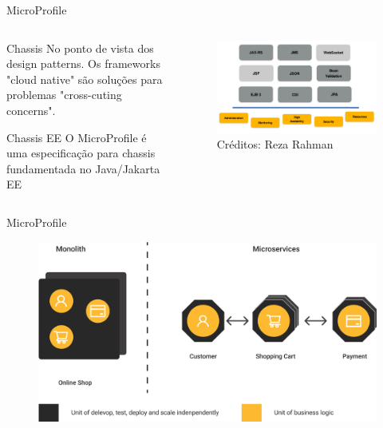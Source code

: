 \documentclass[aspectratio=169]{beamer}
\begin{document}
\begin{frame}{MicroProfile}



\begin{columns}[T] %
\begin{column}[T]{6cm} %
	\begin{block}{Chassis}
No ponto de vista dos design patterns. Os frameworks "cloud native" são soluções para problemas "cross-cuting concerns".
	\end{block}
    \begin{block}{Chassis EE}
O MicroProfile é uma especificação para chassis fundamentada no Java/Jakarta EE
	\end{block}
\end{column}
\begin{column}[T]{7cm} %
    \begin{figure}
    	\centering
    	\includegraphics[width=\linewidth]{Images/javaeemicropancake}
    	\caption{Créditos: Reza Rahman}
    \end{figure}

\end{column}
\end{columns}

\end{frame}

\begin{frame}{MicroProfile}
\begin{figure}
	\centering
	\includegraphics[width=0.7\linewidth]{Images/mp0}
\end{figure}
\end{frame}
\end{document}
